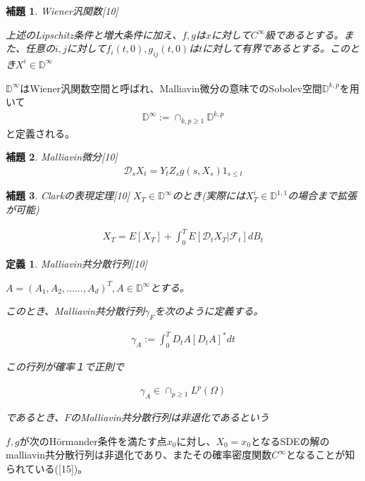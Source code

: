 \documentclass{jsarticle}
\newtheorem{ho}{補題}[section]
\newtheorem{defi}{定義}[section]
\begin{document}
\begin{ho} Wiener汎関数[10]

上述のLipschitz条件と増大条件に加え、$f,g$は$x$に対して$C^\infty$級であるとする。また、任意の$i,j$に対して$f_i(t,0),g_{ij}(t,0)$は$t$に対して有界であるとする。このとき$X^i\in\mathbb{D}^\infty$
\end{ho}

$\mathbb{D}^\infty$はWiener汎関数空間と呼ばれ、Malliavin微分の意味でのSobolev空間$\mathbb{D}^{k,p}$を用いて
\begin{align}
\mathbb{D}^\infty:=\cap_{k,p\geq 1}\mathbb{D}^{k,p}
\end{align}
と定義される。

\begin{ho} Malliavin微分[10]
\begin{align}
\mathcal{D}_sX_t=Y_tZ_sg(s,X_s)1_{s\leq t}
\end{align}
\end{ho}

\begin{ho} Clarkの表現定理[10]
$X_T\in\mathbb{D}^\infty$のとき(実際には$X_T^i\in\mathbb{D}^{1,1}$の場合まで拡張が可能)

\begin{align}
X_T=E[X_T]+\int^T_0 E[\mathcal{D}_tX_T|\mathcal{F}_t]dB_t 
\end{align}


\end{ho}



\begin{defi} Malliavin共分散行列[10]

$A=(A_1,A_2,......,A_d)^T,A\in\mathbb{D}^\infty$とする。

このとき、Malliavin共分散行列$\gamma_F$を次のように定義する。

\begin{align}
\gamma_A:=\int^T_0 D_tA[D_tA]^* dt
\end{align}

この行列が確率１で正則で

\begin{align}
\gamma_A\in \cap_{p\geq 1}L^p(\Omega)
\end{align}

であるとき、$F$のMalliavin共分散行列は非退化であるという
\end{defi}

$f,g$が次のHörmander条件を満たす点$x_0$に対し、$X_0=x_0$となるSDEの解のmalliavin共分散行列は非退化であり、またその確率密度関数$C^\infty$となることが知られている([15])。
\end{document}

